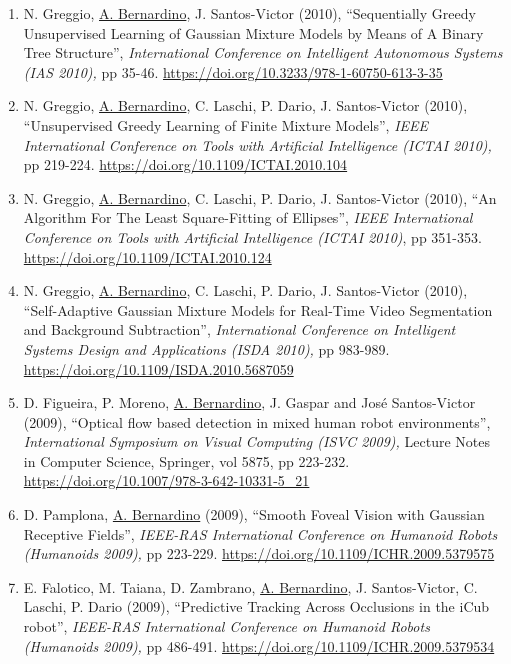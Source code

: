 \begin{enumerate}
{  (ICIAR 2010),} Lecture Notes in Computer Science, Springer, vol 6111,
  pp 105-116. \url{https://doi.org/10.1007/978-3-642-13772-3_12}~
\item
  N. Greggio, \ul{A. Bernardino}, J. Santos-Victor (2010),
  ``Sequentially Greedy Unsupervised Learning of Gaussian Mixture Models
  by Means of A Binary Tree Structure'', \emph{International Conference
  on Intelligent Autonomous Systems (IAS 2010),} pp 35-46.
  \url{https://doi.org/10.3233/978-1-60750-613-3-35}~
\item
  N. Greggio, \ul{A. Bernardino}, C. Laschi, P. Dario, J. Santos-Victor
  (2010), ``Unsupervised Greedy Learning of Finite Mixture Models'',
  \emph{IEEE International Conference on Tools with Artificial
  Intelligence (ICTAI 2010),} pp 219-224.
  \url{https://doi.org/10.1109/ICTAI.2010.104}~
\item
  N. Greggio, \ul{A. Bernardino}, C. Laschi, P. Dario, J. Santos-Victor
  (2010), ``An Algorithm For The Least Square-Fitting of Ellipses'',
  \emph{IEEE International Conference on Tools with Artificial
  Intelligence (ICTAI 2010)}, pp 351-353.
  \url{https://doi.org/10.1109/ICTAI.2010.124}~
\item
  N. Greggio, \ul{A. Bernardino}, C. Laschi, P. Dario, J. Santos-Victor
  (2010), ``Self-Adaptive Gaussian Mixture Models for Real-Time Video
  Segmentation and Background Subtraction'', \emph{International
  Conference on Intelligent Systems Design and Applications (ISDA
  2010),} pp 983-989. \url{https://doi.org/10.1109/ISDA.2010.5687059}~
\item
  D. Figueira, P. Moreno, \ul{A. Bernardino}, J. Gaspar and José
  Santos-Victor (2009), ``Optical flow based detection in mixed human
  robot environments'', \emph{International Symposium on Visual
  Computing (ISVC 2009),} Lecture Notes in Computer Science, Springer,
  vol 5875, pp 223-232.
  \url{https://doi.org/10.1007/978-3-642-10331-5_21}~
\item
  D. Pamplona, \ul{A. Bernardino} (2009), ``Smooth Foveal Vision with
  Gaussian Receptive Fields'', \emph{IEEE-RAS International Conference
  on Humanoid Robots (Humanoids 2009),} pp 223-229.
  \url{https://doi.org/10.1109/ICHR.2009.5379575}~
\item
  E. Falotico, M. Taiana, D. Zambrano, \ul{A. Bernardino}, J.
  Santos-Victor, C. Laschi, P. Dario (2009), ``Predictive Tracking
  Across Occlusions in the iCub robot'', \emph{IEEE-RAS International
  Conference on Humanoid Robots (Humanoids 2009),} pp 486-491.
  \url{https://doi.org/10.1109/ICHR.2009.5379534}~

\end{enumerate}
